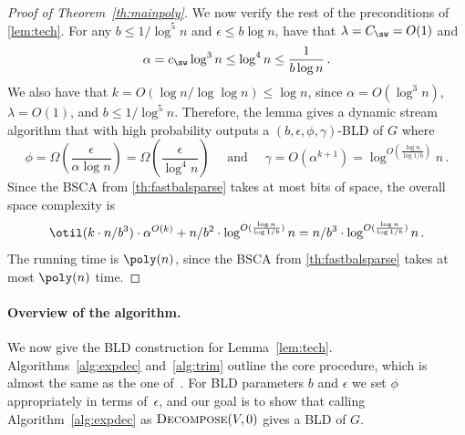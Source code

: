 \begin{proof}[Proof of Theorem~\ref{th:mainpoly}]
	We now verify the rest of the preconditions of \cref{lem:tech}. For any $b \le 1/\log^5 n$ and $\epsilon \le b \log n$, have that $\lambda=C_{\sw} = O(1)$ and
	\begin{equation*}
		\alpha=c_{\sw} \log^3 n \le \log^4 n \le \frac{1}{b \log n} \, .
	\end{equation*}
	We also have that $k = O(\log n /\log\log n) \le \log n$, since $\alpha = O(\log^3 n)$, $\lambda = O(1)$, and $b \le 1/\log^5 n$. Therefore, the lemma gives a dynamic stream algorithm that with high probability outputs a $(b, \epsilon, \phi, \gamma)$-BLD of $G$ where
	\begin{equation*}
		\phi = \Omega\left(\frac{\epsilon}{\alpha \log n}\right) = \Omega\left(\frac{\epsilon}{ \log^4 n}\right) \quad \text{ and } \quad \gamma = O(\alpha^{k+1})= \log^{O(\frac{\log n}{\log 1/b})}n \, .
	\end{equation*}
	Since the BSCA from \cref{th:fastbalsparse} takes at most  bits of space, the overall space complexity is
	\begin{equation*}
		\otil(k \cdot n/b^3) \cdot \alpha^{O(k)} + n/b^2\cdot \log^{O(\frac{\log n}{\log 1/b})}n = n/b^3\cdot \log^{O(\frac{\log n}{\log 1/b})}n \, .
	\end{equation*}
 The running time is $\poly(n)$, since  the BSCA from \cref{th:fastbalsparse} takes at most $\poly(n)$ time.
\end{proof}

\paragraph{Overview of the algorithm.} We now give the BLD construction for Lemma~\ref{lem:tech}. Algorithms~\ref{alg:expdec} and~\ref{alg:trim} outline the core procedure, which is almost the same as the one of~\cite{streamexpdec}. For BLD parameters $b$ and $\epsilon$ we set $\phi$ appropriately in terms of~$\epsilon$, and our goal is to show that calling Algorithm~\ref{alg:expdec} as $\textsc{Decompose}(V,0)$ gives a BLD of $G$.



